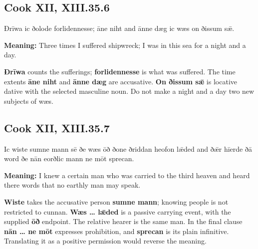 \par\begin{minipage}{\linewidth}\raggedright
\subsection*{Cook XII, XIII.35.6}

Ðrīwa ic ðolode forlidennesse; āne niht and ānne dæg ic wæs on ðissum sǣ.

\textbf{Meaning:} Three times I suffered shipwreck; I was in this sea for a night and a day.

\textbf{Ðrīwa} counts the sufferings; \textbf{forlidennesse} is what was suffered. The time extents \textbf{āne niht} and \textbf{ānne dæg} are accusative. \textbf{On ðissum sǣ} is locative dative with the selected masculine noun. Do not make a night and a day two new subjects of wæs.

\end{minipage}\par\addvspace{4pt}

\par\begin{minipage}{\linewidth}\raggedright
\subsection*{Cook XII, XIII.35.7}

Ic wiste sumne mann sē ðe wæs ōð ðone ðriddan heofon lǣded and ðǣr hīerde ðā word ðe nān eorðlic mann ne mōt sprecan.

\textbf{Meaning:} I knew a certain man who was carried to the third heaven and heard there words that no earthly man may speak.

\textbf{Wiste} takes the accusative person \textbf{sumne mann}; knowing people is not restricted to cunnan. \textbf{Wæs … lǣded} is a passive carrying event, with the supplied \textbf{ōð} endpoint. The relative hearer is the same man. In the final clause \textbf{nān … ne mōt} expresses prohibition, and \textbf{sprecan} is its plain infinitive. Translating it as a positive permission would reverse the meaning.

\end{minipage}\par\addvspace{4pt}

